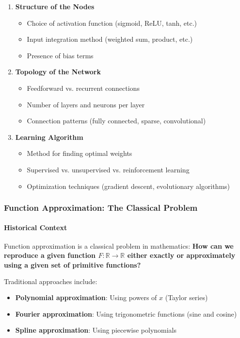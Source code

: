 \begin{enumerate}
\item \textbf{Structure of the Nodes}
\begin{itemize}
\item Choice of activation function (sigmoid, ReLU, tanh, etc.)
\item Input integration method (weighted sum, product, etc.)
\item Presence of bias terms
\end{itemize}

\item \textbf{Topology of the Network}
\begin{itemize}
\item Feedforward vs. recurrent connections
\item Number of layers and neurons per layer
\item Connection patterns (fully connected, sparse, convolutional)
\end{itemize}

\item \textbf{Learning Algorithm}
\begin{itemize}
\item Method for finding optimal weights
\item Supervised vs. unsupervised vs. reinforcement learning
\item Optimization techniques (gradient descent, evolutionary algorithms)
\end{itemize}
\end{enumerate}

\subsubsection{Function Approximation: The Classical Problem}

\paragraph{Historical Context}

Function approximation is a classical problem in mathematics: \textbf{How can we reproduce a given function $F : \mathbb{R} \to \mathbb{R}$ either exactly or approximately using a given set of primitive functions?}

Traditional approaches include:

\begin{itemize}
\item \textbf{Polynomial approximation}: Using powers of $x$ (Taylor series)
\item \textbf{Fourier approximation}: Using trigonometric functions (sine and cosine)
\item \textbf{Spline approximation}: Using piecewise polynomials
\end{itemize}

